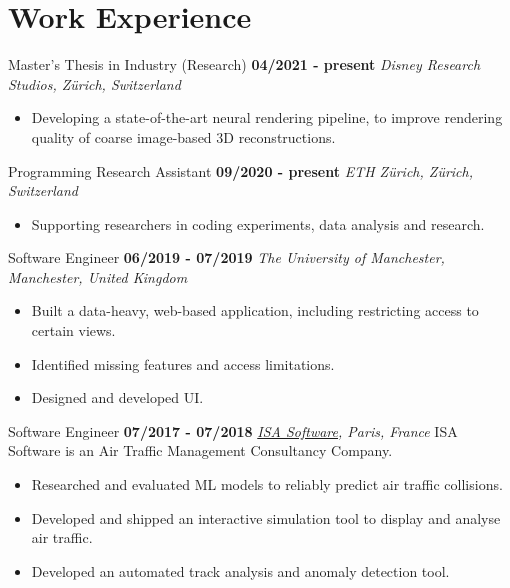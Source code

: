 \documentclass[]{friggeri-cv}
\begin{document}
\section{\color{red}Work \color{gray} Experience}
\begin{entrylist}
  \entry
    {}
    {\large{Master's Thesis in Industry (Research)}}
    {\textbf{04/2021 - present}}
    {\large\emph{{Disney Research Studios}, Zürich, Switzerland}}
    \vspace{-4mm}
    \begin{itemize}
        \item Developing a state-of-the-art neural rendering pipeline, to improve rendering quality of coarse image-based 3D reconstructions.
    \end{itemize}
\end{entrylist}
\smallskip
\begin{entrylist}
  \entry
    {}
    {\large{Programming Research Assistant}}
    {\textbf{09/2020 - present}}
    {\large\emph{{ETH Zürich}, Zürich, Switzerland}}
    \vspace{-4mm}
    \begin{itemize}
        \item Supporting researchers in coding experiments, data analysis and research.
    \end{itemize}
\end{entrylist}
\smallskip
\begin{entrylist}
  \entry
    {}
    {\large{Software Engineer}}
    {\textbf{06/2019 - 07/2019}}
    {\large\emph{{The University of Manchester}, Manchester, United Kingdom}}
    \vspace{-4mm}
    \begin{itemize}
        \item Built a data-heavy, web-based application, including restricting access to certain views.
        \item Identified missing features and access limitations.
        \item Designed and developed UI.
    \end{itemize}
\end{entrylist}
\smallskip
\begin{entrylist}
  \entry
    {}
    {\large{Software Engineer}}
    {\textbf{07/2017 - 07/2018}}
    {\large\emph{\href{https://www.isa-software.com}{ISA Software}, Paris, France}}
    ISA Software is an Air Traffic Management Consultancy Company.
    \begin{itemize}[topsep=0pt]
        \item Researched and evaluated ML models to reliably predict air traffic collisions.
        \item Developed and shipped an interactive simulation tool to display and analyse air traffic.
        \item Developed an automated track analysis and anomaly detection tool.
    \end{itemize}
\end{entrylist}
\end{document}
